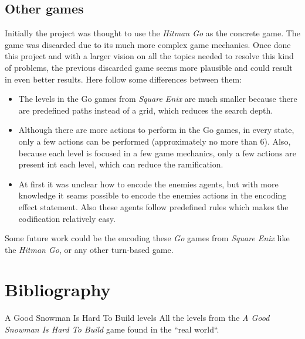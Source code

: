 \documentclass{report}
\theoremstyle{plain}
\begin{document}
\section{Other games}
Initially the project was thought to use the \emph{Hitman Go} as the concrete game. The game was discarded due to its much more complex game mechanics. Once done this project and with a larger vision on all the topics needed to resolve this kind of problems, the previous discarded game seems more plausible and could result in even better results. Here follow some differences between them:
\begin{itemize}
    \item The levels in the Go games from \emph{Square Enix} are much smaller because there are predefined paths instead of a grid, which reduces the search depth.
    \item Although there are more actions to perform in the Go games, in every state, only a few actions can be performed (approximately no more than 6). Also, because each level is focused in a few game mechanics, only a few actions are present int each level, which can reduce the ramification.
    \item At first it was unclear how to encode the enemies agents, but with more knowledge it seams possible to encode the enemies actions in the encoding effect statement. Also these agents follow predefined rules which makes the codification relatively easy.
\end{itemize}

Some future work could be the encoding  these \emph{Go} games from \emph{Square Enix} like the \emph{Hitman Go}, or any other turn-based game.

\chapter{Bibliography}
\begingroup
\renewcommand{\chapter}[2]{}


\endgroup

\chapter{Appendix} 

\section{A Good Snowman Is Hard To Build levels}
All the levels from the \emph{A Good Snowman Is Hard To Build} game found in the ``real world``.
\end{document}
